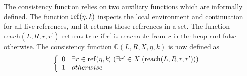 The consistency function relies on two auxiliary functions which are
informally defined. The function $\mathrm{ref}(\eta,\emph{k})$
inspects the local environment and continuation for all live
references, and it returns those references in a set. The function
$\mathrm{reach}(L, R, r, r^\prime)$ returns true if $r^\prime$ is
reachable from $r$ in the heap and false otherwise. The consistency function $\mathbb{C}(L,R,X,\eta,k)$ is now defined as
\[
 \left\{ \begin{array}{rl} 
        0 & \exists r \in \mathrm{ref}(\eta, \emph{k})\ (\exists r^\prime \in X\ (\mathrm{reach}(L, R, r,r^\prime))) \\ 
        1 & \relax{otherwise}\end{array}\right .
\]



\begin{comment}
\begin{algorithm}
 \SetAlgoLined
 \KwData{this text}
 \KwResult{how to write algorithm with \LaTeX2e }
 initialization\;
 \While{not at end of this document $\wedge x < 2$}{
  read current\;
  \eIf{understand}{
   go to next section\;
   current section becomes this one\;
   }{
   go back to the beginning of current section\;
  }
 }
 \caption{How to write algorithms}
\end{algorithm}
\end{comment}
